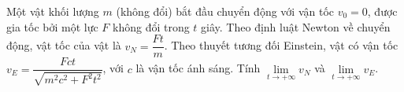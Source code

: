 \begin{bt}%
	Một vật khối lượng $m$ (không đổi) bắt đầu chuyển động với vận tốc $v_0=0$, được gia tốc bởi một lực $F$ không đổi trong $t$ giây. Theo định luật Newton về chuyển động, vật tốc của vật là $v_N = \dfrac{Ft}{m}$. Theo thuyết tương đối Einstein, vật có vận tốc $v_E = \dfrac{Fct}{\sqrt{m^2c^2+F^2t^2}}$, với $c$ là vận tốc ánh sáng. Tính $\displaystyle \lim \limits_{t \to +\infty} v_N$ và $\displaystyle \lim \limits_{t \to +\infty} v_E$.
\end{bt}


